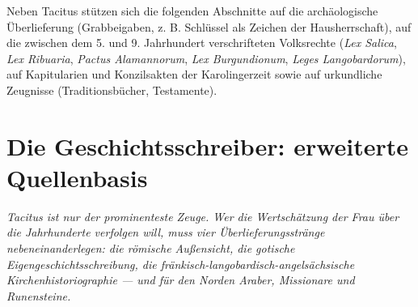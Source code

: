 \documentclass[11pt,a4paper,ngerman]{scrartcl}
\begin{document}
Neben Tacitus stützen sich die folgenden Abschnitte auf die archäologische Überlieferung (Grabbeigaben, z. B. Schlüssel als Zeichen der Hausherrschaft), auf die zwischen dem 5. und 9. Jahrhundert verschrifteten Volksrechte (\emph{Lex Salica}, \emph{Lex Ribuaria}, \emph{Pactus Alamannorum}, \emph{Lex Burgundionum}, \emph{Leges Langobardorum}), auf Kapitularien und Konzilsakten der Karolingerzeit sowie auf urkundliche Zeugnisse (Traditionsbücher, Testamente).


\section{Die Geschichtsschreiber: erweiterte Quellenbasis}

\noindent\textit{Tacitus ist nur der prominenteste Zeuge. Wer die Wertschätzung der Frau über die Jahrhunderte verfolgen will, muss vier Überlieferungsstränge nebeneinanderlegen: die römische Außensicht, die gotische Eigengeschichtsschreibung, die fränkisch-langobardisch-angelsächsische Kirchenhistoriographie — und für den Norden Araber, Missionare und Runensteine.}
\medskip
\end{document}
